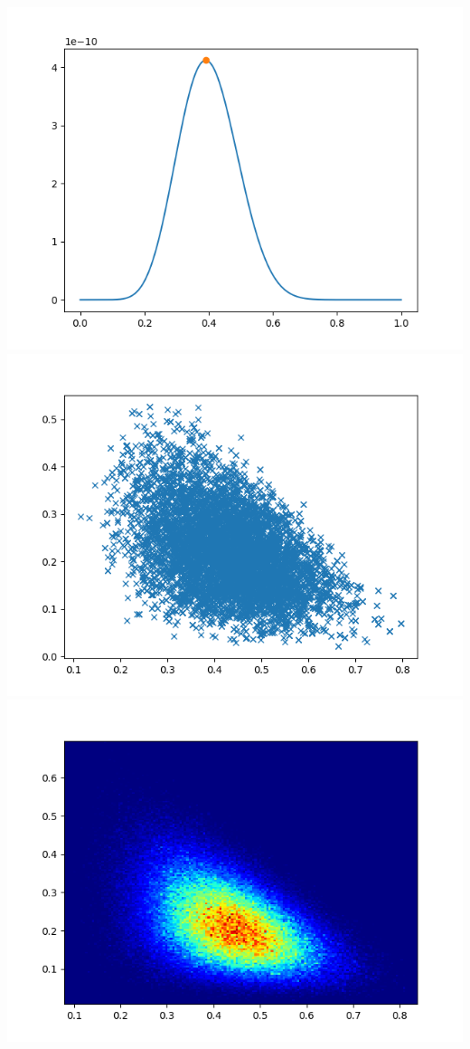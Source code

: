 \documentclass[pt12]{article}
\begin{document}
\newpage

\begin{center}
\includegraphics[scale=0.5]{hip33.png}\\
\includegraphics[scale=0.5]{sc33.png}\\
\includegraphics[scale=0.5]{den33.png}\\
\end{center}
\end{document}
